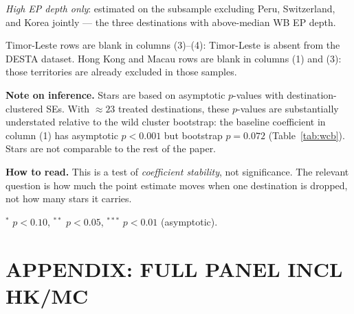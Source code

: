 \documentclass{article}
\begin{document}
\begin{table}[htbp]
\begin{threeparttable}
\begin{tablenotes}[flushleft]
\item \textit{High EP depth only}: estimated on the subsample excluding Peru, Switzerland, and Korea jointly --- the three destinations with above-median WB EP depth.
\item Timor-Leste rows are blank in columns (3)--(4): Timor-Leste is absent from the DESTA dataset. Hong Kong and Macau rows are blank in columns (1) and (3): those territories are already excluded in those samples.
\item \textbf{Note on inference.} Stars are based on asymptotic $p$-values with destination-clustered SEs. With $\approx23$ treated destinations, these $p$-values are substantially understated relative to the wild cluster bootstrap: the baseline coefficient in column (1) has asymptotic $p<0.001$ but bootstrap $p=0.072$ (Table~\ref{tab:wcb}). Stars are not comparable to the rest of the paper.
\item \textbf{How to read.} This is a test of \emph{coefficient stability}, not significance. The relevant question is how much the point estimate moves when one destination is dropped, not how many stars it carries.
\item $^{*}$ $p<0.10$, $^{**}$ $p<0.05$, $^{***}$ $p<0.01$ (asymptotic).
\end{tablenotes}
\end{threeparttable}
\end{table}


\newpage
%
%

\section{APPENDIX: FULL PANEL INCL HK/MC}
\end{document}
